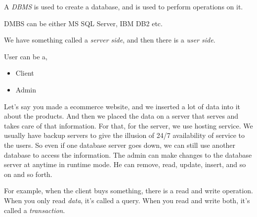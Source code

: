 \documentclass{article}
\begin{document}
    A \textit{DBMS} is used to create a database, and is used to perform operations on it. 

    DMBS can be either MS SQL Server, IBM DB2 etc.

    We have something called a \textit{server side}, and then there is a \textit{user side}.

    User can be a,
    \begin{itemize}
        \item Client
        \item Admin
    \end{itemize}

    Let's say you made a ecommerce website, and we inserted a lot of data into it about the products. And then we placed the data on a server that serves and takes care of that information.
    For that, for the server, we use hosting service.
    We usually have backup servers to give the illusion of 24/7 availability of service to the users. So even if one database server goes down, we can still use another database to access the information.
    The admin can make changes to the database server at anytime in runtime mode. He can remove, read, update, insert, and so on and so forth.

    For example, when the client buys something, there is a read and write operation. 
    When you only read \textit{data}, it's called a query. When you read and write both, it's called a \textit{transaction}.
\end{document}
